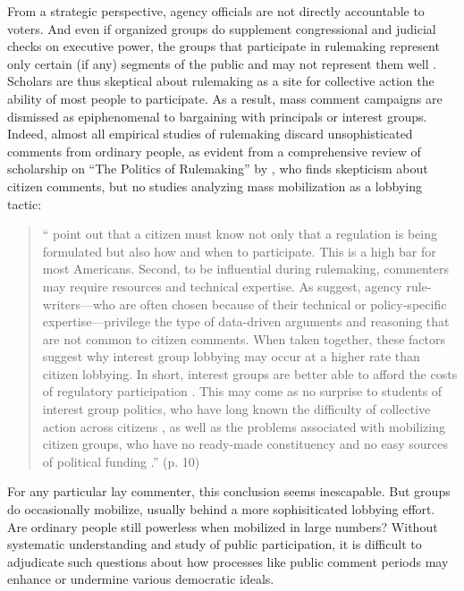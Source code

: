 From a strategic perspective, agency officials are not directly accountable to voters. And even if organized groups do supplement congressional and judicial checks on executive power, the groups that participate in rulemaking represent only certain (if any) segments of the public and may not represent them well \citep{Seifter2016UCLA}. Scholars are thus skeptical about rulemaking as a site for collective action the ability of most people to participate.
As a result, mass comment campaigns are dismissed as epiphenomenal to bargaining with principals or interest groups. Indeed, almost all empirical studies of rulemaking discard unsophisticated comments from ordinary people, as evident from a comprehensive review of scholarship on ``The Politics of Rulemaking'' by \citet{Yackee2018}, who finds skepticism about citizen comments, but no studies analyzing mass mobilization as a lobbying tactic:
\begin{quote}
    ``\citet{Kerwin2011} point out that a citizen must know not only that a regulation is being formulated but also how and when to participate. This is a high bar for most Americans. Second, to be influential during rulemaking, commenters may require resources and technical expertise. As \citet{Epstein2014} suggest, agency rule-writers—who are often chosen because of their technical or policy-specific expertise—privilege the type of data-driven arguments and reasoning that are not common to citizen comments.
    When taken together, these factors suggest why interest group lobbying may occur at a higher rate than citizen lobbying. In short, interest groups are better able to afford the costs of regulatory participation \citep{Yackee2006BJPS}. This may come as no surprise to students of interest group politics, who have long known the difficulty of collective action across citizens \citep{Olson1965}, as well as the problems associated with mobilizing citizen groups, who have no ready-made constituency and no easy sources of political funding \citep{Walker1991}.'' (p. 10)
     \end{quote}
For any particular lay commenter, this conclusion seems inescapable. But groups do occasionally mobilize, usually behind a more sophisiticated lobbying effort. Are ordinary people still powerless when mobilized in large numbers?
Without systematic understanding and study of public participation, it is difficult to adjudicate such questions about how processes like public comment periods may enhance or undermine various democratic ideals.

